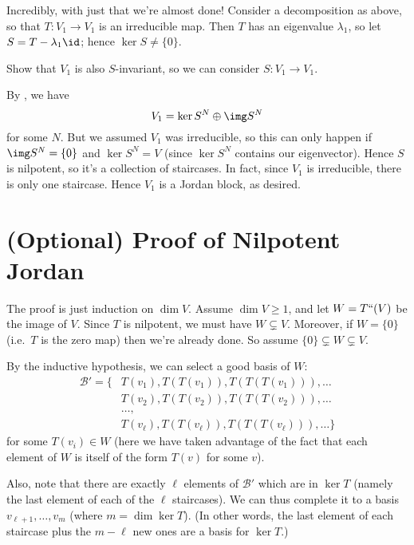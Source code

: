Incredibly, with just that we're almost done!
Consider a decomposition as above, so that $T : V_1 \to V_1$ is an irreducible map.
Then $T$ has an eigenvalue $\lambda_1$, so let $S = T - \lambda_1 \id$; hence $\ker S \neq \{0\}$.
\begin{ques}
	Show that $V_1$ is also $S$-invariant, so we can consider $S : V_1 \to V_1$.
\end{ques}
By , we have
\[ V_1 = \ker S^N \oplus \img S^N \]
for some $N$.
But we assumed $V_1$ was irreducible, so this can only happen if $\img S^N = \{0\}$ and $\ker S^N = V$
(since $\ker S^N$ contains our eigenvector).
Hence $S$ is nilpotent, so it's a collection of staircases.
In fact, since $V_1$ is irreducible, there is only one staircase.
Hence $V_1$ is a Jordan block, as desired.

\section{(Optional) Proof of Nilpotent Jordan}
The proof is just induction on $\dim V$.
Assume $\dim V \ge 1$, and let $W = T``(V)$ be the image of $V$.
Since $T$ is nilpotent, we must have $W \subsetneq V$.
Moreover, if $W = \{0\}$ (i.e.\ $T$ is the zero map) then we're already done.
So assume $\{0\} \subsetneq W \subsetneq V$.

By the inductive hypothesis, we can select a good basis of $W$:
\begin{align*}
	\mathcal B' =
	\Big\{ & T(v_1), T(T(v_1)), T(T(T(v_1))), \dots \\
	& T(v_2), T(T(v_2)), T(T(T(v_2))), \dots \\
	& \dots, \\
	& T(v_\ell), T(T(v_\ell)), T(T(T(v_\ell))), \dots \Big\}
\end{align*}
for some $T(v_i) \in W$ (here we have taken advantage of the fact that each element of $W$ is itself of the form $T(v)$ for some $v$).

Also, note that there are exactly $\ell$ elements of $\mathcal B'$ which are in $\ker T$
(namely the last element of each of the $\ell$ staircases).
We can thus complete it to a basis $v_{\ell+1}, \dots, v_m$ (where $m = \dim \ker T$).
(In other words, the last element of each staircase plus the $m-\ell$ new ones are a basis for $\ker T$.)

